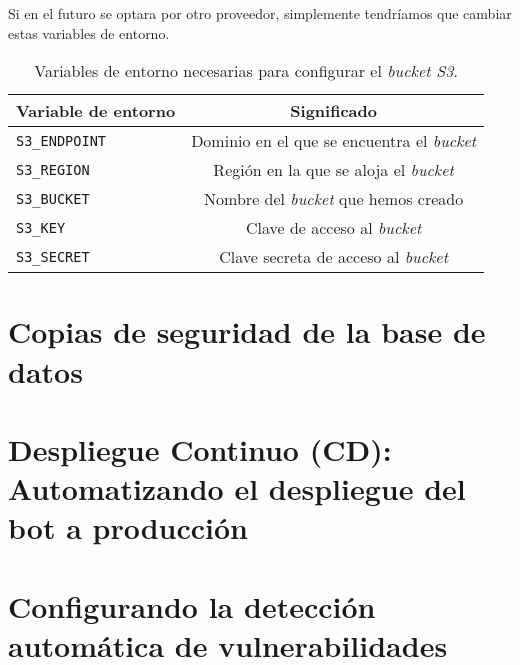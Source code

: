 Si en el futuro se optara por otro proveedor, simplemente tendríamos que cambiar estas variables de entorno.

\begin{table}[]
    \centering
    \begin{tabular}{|l|c|}
        \hline
        \textbf{Variable de entorno} & \textbf{Significado} \\
        \hline
        \texttt{S3\_ENDPOINT} & Dominio en el que se encuentra el \textit{bucket} \\
        \hline
        \texttt{S3\_REGION} & Región en la que se aloja el \textit{bucket} \\
        \hline
        \texttt{S3\_BUCKET} & Nombre del \textit{bucket} que hemos creado \\
        \hline
        \texttt{S3\_KEY} & Clave de acceso al \textit{bucket} \\
        \hline
        \texttt{S3\_SECRET} & Clave secreta de acceso al \textit{bucket} \\
        \hline
    \end{tabular}
    \caption{Variables de entorno necesarias para configurar el \textit{bucket S3}.}
    \label{tab:envS3}
\end{table}


\section{Copias de seguridad de la base de datos}





\section{Despliegue Continuo (CD): Automatizando el despliegue del bot a producción}




\section{Configurando la detección automática de vulnerabilidades}



